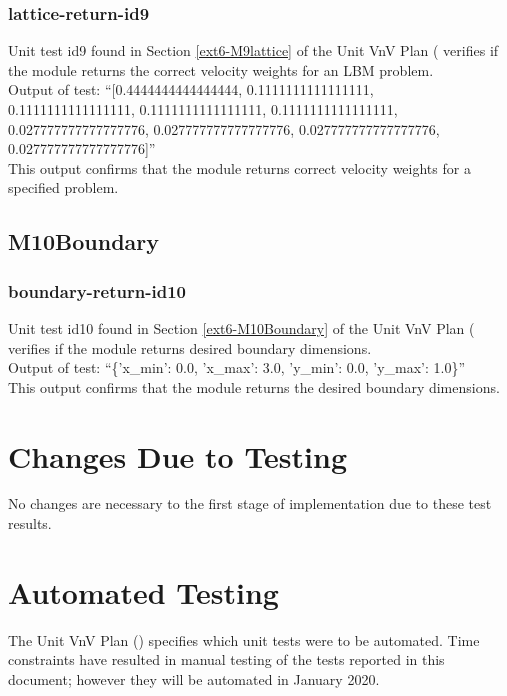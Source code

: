 \documentclass[12pt, titlepage]{article}
\begin{document}
\subsubsection{lattice-return-id9}

Unit test id9 found in Section \ref{ext6-M9lattice} of the Unit VnV Plan (\citet{LBM_UVNV_PM} verifies if the module returns the correct velocity weights for an LBM problem.\\

\noindent Output of test: ``[0.4444444444444444, 0.1111111111111111,
\\0.1111111111111111, 0.1111111111111111, 0.1111111111111111,
\\0.027777777777777776, 0.027777777777777776, 0.027777777777777776,
\\0.027777777777777776]''\\

\noindent This output confirms that the module returns correct velocity weights for a specified problem.

\subsection{M10Boundary}
\subsubsection{boundary-return-id10}

Unit test id10 found in Section \ref{ext6-M10Boundary} of the Unit VnV Plan (\citet{LBM_UVNV_PM} verifies if the module returns desired boundary dimensions.\\

\noindent Output of test: ``\{’x\_min’: 0.0, ’x\_max’: 3.0, ’y\_min’: 0.0, ’y\_max’: 1.0\}''\\

\noindent This output confirms that the module returns the desired boundary dimensions.

\section{Changes Due to Testing}
No changes are necessary to the first stage of implementation due to these test results.

\section{Automated Testing}

The Unit VnV Plan (\citet{LBM_UVNV_PM}) specifies which unit tests were to be automated. Time constraints have resulted in manual testing of the tests reported in this document; however they will be automated in January 2020.
\end{document}
